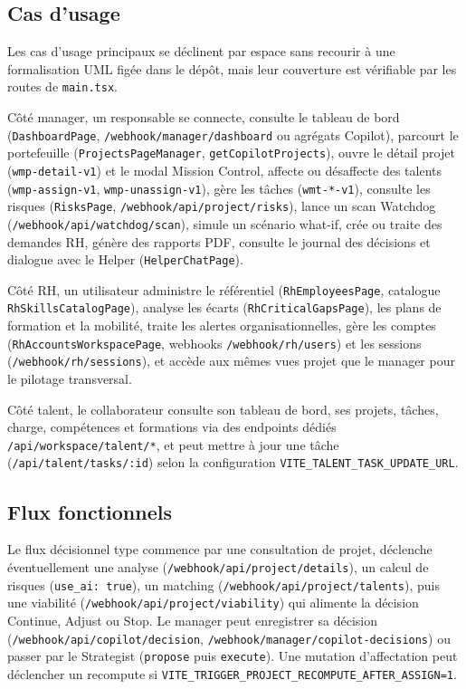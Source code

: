 \subsection{Cas d'usage}

Les cas d'usage principaux se déclinent par espace sans recourir à une formalisation UML figée dans le dépôt, mais leur couverture est vérifiable par les routes de \texttt{main.tsx}.

Côté manager, un responsable se connecte, consulte le tableau de bord (\texttt{DashboardPage}, \texttt{/webhook/manager/dashboard} ou agrégats Copilot), parcourt le portefeuille (\texttt{ProjectsPageManager}, \texttt{getCopilotProjects}), ouvre le détail projet (\texttt{wmp-detail-v1}) et le modal Mission Control, affecte ou désaffecte des talents (\texttt{wmp-assign-v1}, \texttt{wmp-unassign-v1}), gère les tâches (\texttt{wmt-*-v1}), consulte les risques (\texttt{RisksPage}, \texttt{/webhook/api/project/risks}), lance un scan Watchdog (\texttt{/webhook/api/watchdog/scan}), simule un scénario what-if, crée ou traite des demandes RH, génère des rapports PDF, consulte le journal des décisions et dialogue avec le Helper (\texttt{HelperChatPage}).

Côté RH, un utilisateur administre le référentiel (\texttt{RhEmployeesPage}, catalogue \texttt{RhSkillsCatalogPage}), analyse les écarts (\texttt{RhCriticalGapsPage}), les plans de formation et la mobilité, traite les alertes organisationnelles, gère les comptes (\texttt{RhAccountsWorkspacePage}, webhooks \texttt{/webhook/rh/users}) et les sessions (\texttt{/webhook/rh/sessions}), et accède aux mêmes vues projet que le manager pour le pilotage transversal.

Côté talent, le collaborateur consulte son tableau de bord, ses projets, tâches, charge, compétences et formations via des endpoints dédiés \texttt{/api/workspace/talent/*}, et peut mettre à jour une tâche (\texttt{/api/talent/tasks/:id}) selon la configuration \texttt{VITE\_TALENT\_TASK\_UPDATE\_URL}.

\subsection{Flux fonctionnels}

Le flux décisionnel type commence par une consultation de projet, déclenche éventuellement une analyse (\texttt{/webhook/api/project/details}), un calcul de risques (\texttt{use\_ai: true}), un matching (\texttt{/webhook/api/project/talents}), puis une viabilité (\texttt{/webhook/api/project/viability}) qui alimente la décision Continue, Adjust ou Stop. Le manager peut enregistrer sa décision (\texttt{/webhook/api/copilot/decision}, \texttt{/webhook/manager/copilot-decisions}) ou passer par le Strategist (\texttt{propose} puis \texttt{execute}). Une mutation d'affectation peut déclencher un recompute si \texttt{VITE\_TRIGGER\_PROJECT\_RECOMPUTE\_AFTER\_ASSIGN=1}.

